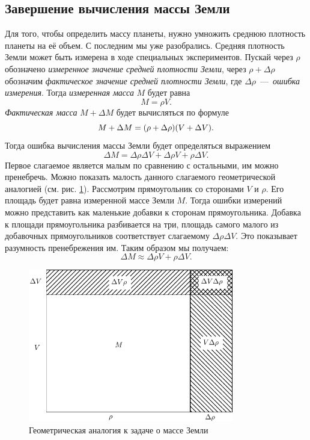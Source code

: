 \documentclass[12pt]{article}
\begin{document}
\subsection{Завершение вычисления массы Земли}
Для того, чтобы определить массу планеты, нужно умножить среднюю плотность планеты на её объем. С последним мы уже разобрались. Средняя плотность Земли может быть измерена в ходе специальных экспериментов. Пускай через $\rho$ обозначено \emph{измеренное значение средней плотности Земли}, через $\rho + \Delta \rho$ обозначим \emph{фактическое значение средней плотности Земли}, где $\Delta \rho$~\----~\emph{ошибка измерения}. Тогда \emph{измеренная масса} $M$ будет равна
\begin{equation}
 M = \rho V.
\end{equation}
\emph{Фактическая масса} $M + \Delta M$ будет вычисляться по формуле
\begin{equation}
 M + \Delta M = \qty(\rho + \Delta \rho) \qty(V + \Delta V).
\end{equation}
Тогда ошибка вычисления массы Земли будет определяться выражением
\begin{equation}
 \Delta M = \Delta \rho \Delta V + \Delta \rho V + \rho \Delta V .
\end{equation}
Первое слагаемое является малым по сравнению с остальными, им можно пренебречь. Можно показать малость данного слагаемого геометрической аналогией (см. рис. \ref{fig:5}). Рассмотрим прямоугольник со сторонами $V$ и $\rho$. Его площадь будет равна измеренной массе Земли $M$. Тогда ошибки измерений можно представить как маленькие добавки к сторонам прямоугольника. Добавка к площади прямоугольника разбивается на три, площадь самого малого из добавочных прямоугольников соответствует слагаемому $\Delta \rho \Delta V$. Это показывает разумность пренебрежения им. Таким образом мы получаем:
\begin{equation}\label{eq:14}
 \Delta M \approx \Delta \rho V + \rho \Delta V.
\end{equation}
\begin{figure}[!ht]
 \centering
 \includegraphics[width=0.8\textwidth]{first4.pdf}
 \caption{Геометрическая аналогия к задаче о массе Земли}
 \label{fig:5}
\end{figure}
\end{document}
